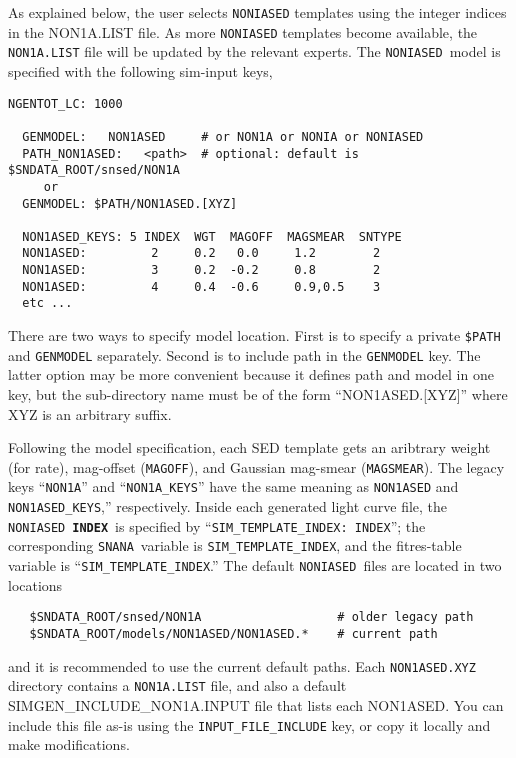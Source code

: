 \documentclass[12pt]{article}
\newcommand{\NONIA}{{\tt NONIASED}}
\newcommand{\snana}{{\tt SNANA}}
\newcommand{\indx}{{\bf\tt INDEX}}
\begin{document}
\medskip
As explained below, the user selects {\NONIA} templates 
using the integer indices in the {NON1A.LIST} file.
As more {\NONIA} templates become available, 
the {\tt NON1A.LIST} file will be updated by the relevant experts.
The \NONIA\ model is specified with the following sim-input keys,
%
\begin{Verbatim}[frame=single]
  NGENTOT_LC: 1000

  GENMODEL:   NON1ASED     # or NON1A or NONIA or NONIASED
  PATH_NON1ASED:   <path>  # optional: default is $SNDATA_ROOT/snsed/NON1A
     or
  GENMODEL: $PATH/NON1ASED.[XYZ]

  NON1ASED_KEYS: 5 INDEX  WGT  MAGOFF  MAGSMEAR  SNTYPE
  NON1ASED:         2     0.2   0.0     1.2        2
  NON1ASED:         3     0.2  -0.2     0.8        2
  NON1ASED:         4     0.4  -0.6     0.9,0.5    3
  etc ...
\end{Verbatim}
There are two ways to specify model location. First is to specify
a private {\tt \$PATH} and {\tt GENMODEL} separately. 
Second is to include path in the {\tt GENMODEL} key. 
The latter option may be more convenient because it defines path and model
in one key, but the sub-directory name must be of the form 
``NON1ASED.[XYZ]'' where XYZ is an arbitrary suffix.

Following the model specification, each SED template gets an aribtrary
weight (for rate), mag-offset ({\tt MAGOFF}), and Gaussian mag-smear
({\tt MAGSMEAR}).
The legacy keys ``{\tt NON1A}'' and ``{\tt NON1A\_KEYS}''
have the same meaning as {\tt NON1ASED} and {\tt NON1ASED\_KEYS},''
respectively.
Inside each generated light curve file, the \NONIA\ \indx\ is 
specified by ``{\tt SIM\_TEMPLATE\_INDEX: INDEX}'';
the corresponding \snana\ variable is {\tt SIM\_TEMPLATE\_INDEX},
and the fitres-table variable is ``{\tt SIM\_TEMPLATE\_INDEX}.''
The default \NONIA\ files are located in two locations
\begin{verbatim}
   $SNDATA_ROOT/snsed/NON1A                   # older legacy path
   $SNDATA_ROOT/models/NON1ASED/NON1ASED.*    # current path
\end{verbatim}
and it is recommended to use the current default paths.
Each {\tt NON1ASED.XYZ} directory contains a {\tt NON1A.LIST} file,
and also a default {SIMGEN\_INCLUDE\_NON1A.INPUT} file that lists
each NON1ASED. You can include this file as-is using the
{\tt INPUT\_FILE\_INCLUDE} key, or copy it locally and make modifications.
\end{document}

